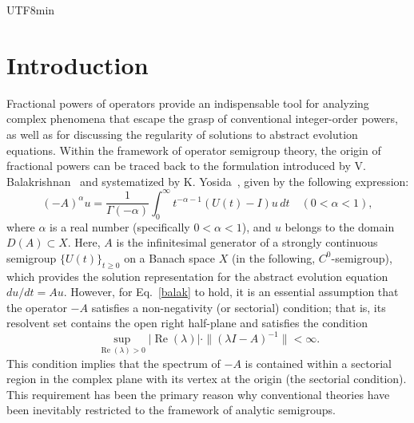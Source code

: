 \documentclass[10pt,a4paper]{article}
\theoremstyle{definition}
\theoremstyle{remark}
\begin{document}
\begin{CJK}{UTF8}{min}
\section{Introduction}
Fractional powers of operators provide an indispensable tool for analyzing complex phenomena that escape the grasp of conventional integer-order powers, as well as for discussing the regularity of solutions to abstract evolution equations. 
Within the framework of operator semigroup theory, the origin of fractional powers can be traced back to the formulation introduced by V. Balakrishnan~\cite{60Balakrishnan} and systematized by K. Yosida~\cite{65yosida}, given by the following expression:
\begin{equation} \label{balak}
(-A)^{\alpha} u = \frac{1}{\Gamma(-\alpha)} \int_0^\infty t^{-\alpha-1} (U(t)-I) u \, dt \quad (0 < \alpha < 1),
\end{equation}
where $\alpha$ is a real number (specifically $0 < \alpha < 1$), and $u$ belongs to the domain $D(A) \subset X$. 
Here, $A$ is the infinitesimal generator of a strongly continuous semigroup $\{ U(t) \}_{t \ge 0}$ on a Banach space $X$ (in the following, $C^0$-semigroup), which provides the solution representation for the abstract evolution equation $du/dt = Au$.
However, for Eq.~\eqref{balak} to hold, it is an essential assumption that the operator $-A$ satisfies a non-negativity (or sectorial) condition; that is, its resolvent set contains the open right half-plane and satisfies the condition
\begin{equation}
\sup_{\operatorname{Re}(\lambda)>0} | \operatorname{Re} (\lambda)| \cdot
\|(\lambda I - A)^{-1} \| < \infty.
\end{equation}
This condition implies that the spectrum of $-A$ is contained within a sectorial region in the complex plane with its vertex at the origin (the sectorial condition). 
This requirement has been the primary reason why conventional theories have been inevitably restricted to the framework of analytic semigroups.


\end{CJK}
\end{document}
